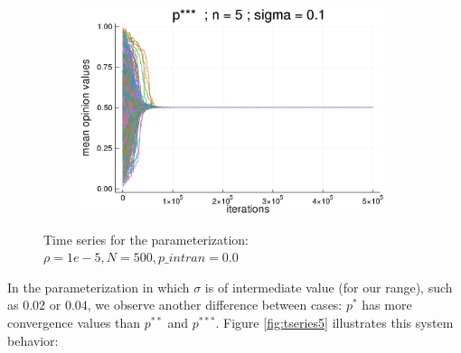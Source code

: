 \documentclass{article}
\begin{document}
\begin{figure}[H]
\begin{subfigure}[b]{0.45\textwidth}
      \end{subfigure}
      \begin{subfigure}[b]{0.5\textwidth}
        \includegraphics[width=\textwidth]{img/compare-ps/Poodlcalculatep***n5-rho1e-5-sigma01-00intrans.png}
      \end{subfigure}
      \caption{Time series for the parameterization: \(\rho = 1e-5, N =
        500, p\_intran = 0.0 \)}
      \label{fig:tseries4}
    \end{figure}
    In the parameterization in which \(\sigma\) is of intermediate value (for
    our range), such as \(0.02\) or \(0.04\), we observe another difference
    between cases: \(p^{*}\) has more convergence values than \(p^{**}\) and
    \(p^{***}\). Figure \ref{fig:tseries5} illustrates this system behavior:
\end{document}
